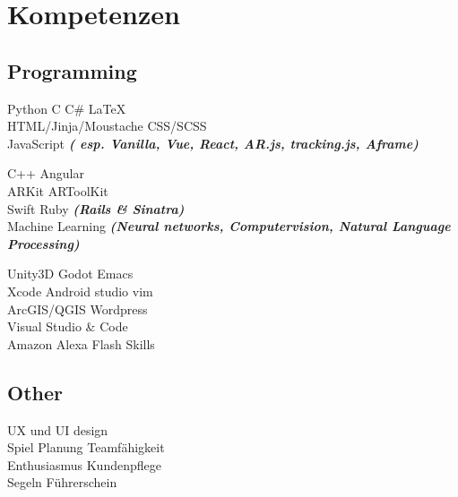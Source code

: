\documentclass[a4paper]{deedy-resume_twopage} %
\begin{document}
\begin{minipage}[t]{0.33\textwidth}

  \sectionspace
  \section{Kompetenzen}

  \subsection{Programming}
  \textbullet{} Python
  \textbullet{} C  \textbullet{} C\# \textbullet{} \LaTeX\ \\
  \textbullet{} HTML/Jinja/Moustache \textbullet{} CSS/SCSS \\
   \textbullet{} JavaScript {\footnotesize \textit{\textbf{( esp. Vanilla, Vue, React, AR.js, tracking.js, Aframe)}}} \\

  \sectionspace

  \textbullet{} C++ \textbullet{} Angular \\
  \textbullet{} ARKit \textbullet{} ARToolKit \\
  \textbullet{} Swift \textbullet{}  Ruby {\footnotesize \textit{\textbf{(Rails \& Sinatra)}}} \\
  \textbullet{} Machine Learning {\footnotesize \textit{\textbf{(Neural networks, Computervision, Natural Language Processing)}}}

  \sectionspace

  \textbullet{} Unity3D \textbullet{} Godot \textbullet{} Emacs \\
  \textbullet{} Xcode \textbullet{} Android studio \textbullet{} vim \\
  \textbullet{} ArcGIS/QGIS \textbullet{} Wordpress \\
  \textbullet{} Visual Studio \& Code \\
  \textbullet{} Amazon Alexa Flash Skills\\

  \sectionspace

  \subsection{Other}
  \textbullet{} UX und UI design \\
  \textbullet{} Spiel Planung \textbullet{} Teamfähigkeit \\
  \textbullet{} Enthusiasmus \textbullet{} Kundenpflege \\
  \textbullet{} Segeln \textbullet{} Führerschein\\


\end{minipage}
\end{document}
